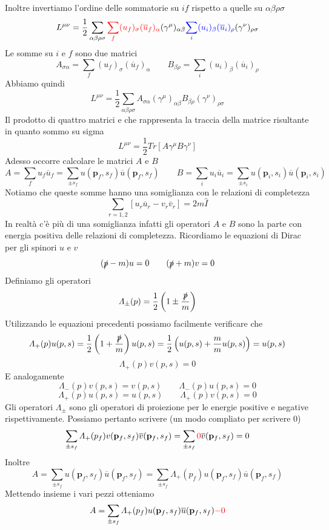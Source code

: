Inoltre invertiamo l'ordine delle sommatorie su $if$ rispetto a quelle su $\alpha\beta\rho\sigma$
$$
L^{\mu\nu} = \frac{1}{2} \sum_{\alpha\beta\rho\sigma}\textcolor{red}{\sum_f (u_f)_\sigma (\overline{u}_f)_\alpha} (\gamma^\mu)_{\alpha\beta} \textcolor{blue}{\sum_i (u_i)_\beta (\overline{u}_i)_\rho} (\gamma^\nu)_{\rho\sigma}
$$
Le somme su $i$ e $f$ sono due matrici
$$
A_{\sigma\alpha} = \sum_f (u_f)_\sigma (\overline{u}_f)_\alpha \qquad B_{\beta\rho} = \sum_i (u_i)_\beta (\overline{u}_i)_\rho
$$
Abbiamo quindi
$$
L^{\mu\nu} = \frac{1}{2} \sum_{\alpha\beta\rho\sigma} A_{\sigma\alpha} (\gamma^\mu)_{\alpha\beta} B_{\beta\rho} (\gamma^\nu)_{\rho\sigma}
$$
Il prodotto di quattro matrici e che rappresenta la traccia della matrice risultante in quanto sommo su sigma
$$
L^{\mu\nu} = \frac{1}{2} 
Tr \left[ A \gamma^\mu B \gamma^\nu \right]
$$
Adesso occorre calcolare le matrici $A$ e $B$
$$
A = \sum_f u_f \overline{u}_f = \sum_{\pm s_f} u(\mathbf{p}_f, s_f) \overline{u}(\mathbf{p}_f, s_f) \qquad B = \sum_i u_i \overline{u}_i = \sum_{\pm s_i} u(\mathbf{p}_i, s_i) \overline{u}(\mathbf{p}_i, s_i)
$$
Notiamo che queste somme hanno una somiglianza con le relazioni di completezza
$$
\sum_{r=1,2} \left[ u_r \overline{u}_r - v_r \overline{v}_r \right] = 2m\hat{I}
$$
In realtà c'è più di una somiglianza infatti gli operatori $A$ e $B$ sono la parte con energia positiva delle relazioni di completezza. Ricordiamo le equazioni di Dirac per gli spinori $u$ e $v$
$$
(\slashed{p} - m) u = 0 \qquad (\slashed{p} + m) v = 0
$$
Definiamo gli operatori
$$
\Lambda_\pm (p) = \frac{1}{2} \left( 1 \pm \frac{\slashed{p}}{m} \right)
$$
Utilizzando le equazioni precedenti possiamo facilmente verificare che
$$
\Lambda_+ (p) u(p,s) = \frac{1}{2} \left( 1 + \frac{\slashed{p}}{m} \right) u(p,s) = \frac{1}{2} \left( u(p,s) + \frac{m}{m} u(p,s) \right) = u(p,s)
$$
$$
\Lambda_+ (p) v(p,s) = 0
$$
E analogamente 
$$
\Lambda_- (p) v(p,s) = v(p,s) \qquad \Lambda_- (p) u(p,s) = 0
$$
$$
\Lambda_+ (p) u(p,s) = u(p,s) \qquad \Lambda_+ (p) v(p,s) = 0
$$
Gli operatori $\Lambda_\pm$ sono gli operatori di proiezione per le energie positive e negative rispettivamente. Possiamo pertanto scrivere (un modo compliato per scrivere 0)
$$
\sum_{\pm s_f} \Lambda_+(p_f) v(\mathbf{p}_f, s_f) \overline{v}(\mathbf{p}_f, s_f) = \sum_{\pm s_f} \textcolor{red}{0} \overline{v}(\mathbf{p}_f, s_f) = 0
$$
Inoltre
$$
A = \sum_{\pm s_f} u(\mathbf{p}_f, s_f) \overline{u}(\mathbf{p}_f, s_f) = \sum_{\pm s_f} \Lambda_+(p_f) u(\mathbf{p}_f, s_f) \overline{u}(\mathbf{p}_f, s_f)
$$
Mettendo insieme i vari pezzi otteniamo
$$
A = \sum_{\pm s_f} \Lambda_+(p_f) u(\mathbf{p}_f, s_f) \overline{u}(\mathbf{p}_f, s_f) \textcolor{red}{-0}
$$
